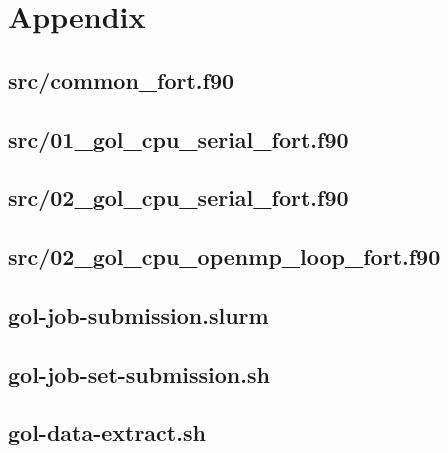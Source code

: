 \documentclass[]{article}
\begin{document}
\clearpage
\appendix
\section{Appendix}
\label{sec:appendix}

\subsection{src/common\_fort.f90}
\label{sec:common_fort}



\newpage
\subsection{src/01\_gol\_cpu\_serial\_fort.f90}
\label{sec:01_gol_cpu_serial_fort}



\newpage
\subsection{src/02\_gol\_cpu\_serial\_fort.f90}
\label{sec:02_gol_cpu_serial_fort}



\newpage
\subsection{src/02\_gol\_cpu\_openmp\_loop\_fort.f90}
\label{sec:02_gol_cpu_openmp_loop_fort}



\newpage
\subsection{gol-job-submission.slurm}
\label{sec:gol-job-submission}



\newpage
\subsection{gol-job-set-submission.sh}
\label{sec:gol-job-set-submission}



\newpage
\subsection{gol-data-extract.sh}
\label{sec:gol-data-extract}


\end{document}

